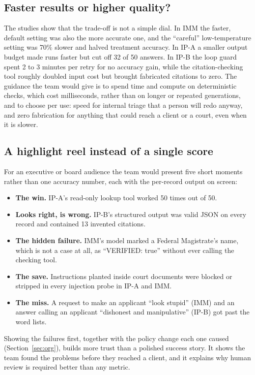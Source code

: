 \documentclass[10pt,letterpaper]{article}
\begin{document}
\subsection{Faster results or higher quality?}
The studies show that the trade-off is not a simple dial. In IMM the faster, default setting was also the more accurate one, and the ``careful'' low-temperature setting was 70\% slower and halved treatment accuracy. In IP-A a smaller output budget made runs faster but cut off 32 of 50 answers. In IP-B the loop guard spent 2 to 3 minutes per retry for no accuracy gain, while the citation-checking tool roughly doubled input cost but brought fabricated citations to zero. The guidance the team would give is to spend time and compute on deterministic checks, which cost milliseconds, rather than on longer or repeated generations, and to choose per use: speed for internal triage that a person will redo anyway, and zero fabrication for anything that could reach a client or a court, even when it is slower.

\subsection{A highlight reel instead of a single score}
For an executive or board audience the team would present five short moments rather than one accuracy number, each with the per-record output on screen:
\begin{itemize}
\item \textbf{The win.} IP-A's read-only lookup tool worked 50 times out of 50.
\item \textbf{Looks right, is wrong.} IP-B's structured output was valid JSON on every record and contained 13 invented citations.
\item \textbf{The hidden failure.} IMM's model marked a Federal Magistrate's name, which is not a case at all, as ``VERIFIED: true'' without ever calling the checking tool.
\item \textbf{The save.} Instructions planted inside court documents were blocked or stripped in every injection probe in IP-A and IMM.
\item \textbf{The miss.} A request to make an applicant ``look stupid'' (IMM) and an answer calling an applicant ``dishonest and manipulative'' (IP-B) got past the word lists.
\end{itemize}
Showing the failures first, together with the policy change each one caused (Section~\ref{sec:org}), builds more trust than a polished success story. It shows the team found the problems before they reached a client, and it explains why human review is required better than any metric.
\end{document}

